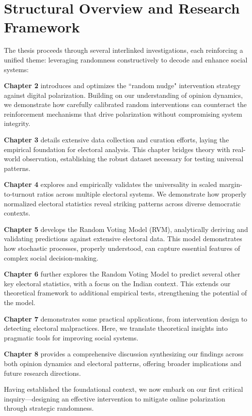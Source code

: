 \section{Structural Overview and Research Framework}

The thesis proceeds through several interlinked investigations, each reinforcing a unified theme: leveraging randomness constructively to decode and enhance social systems:

\textbf{Chapter 2} introduces and optimizes the ``random nudge" intervention strategy against digital polarization. Building on our understanding of opinion dynamics, we demonstrate how carefully calibrated random interventions can counteract the reinforcement mechanisms that drive polarization without compromising system integrity.

\textbf{Chapter 3} details extensive data collection and curation efforts, laying the empirical foundation for electoral analysis. This chapter bridges theory with real-world observation, establishing the robust dataset necessary for testing universal patterns.

\textbf{Chapter 4} explores and empirically validates the universality in scaled margin-to-turnout ratios across multiple electoral systems. We demonstrate how properly normalized electoral statistics reveal striking patterns across diverse democratic contexts.

\textbf{Chapter 5} develops the Random Voting Model (RVM), analytically deriving and validating predictions against extensive electoral data. This model demonstrates how stochastic processes, properly understood, can capture essential features of complex social decision-making.

\textbf{Chapter 6} further explores the Random Voting Model to predict several other key electoral statistics, with a focus on the Indian context. This extends our theoretical framework to additional empirical tests, strengthening the potential of the model.

\textbf{Chapter 7} demonstrates some practical applications, from intervention design to detecting electoral malpractices. Here, we translate theoretical insights into pragmatic tools for improving social systems.

\textbf{Chapter 8} provides a comprehensive discussion synthesizing our findings across both opinion dynamics and electoral patterns, offering broader implications and future research directions. \

Having established the foundational context, we now embark on our first critical inquiry—designing an effective intervention to mitigate online polarization through strategic randomness.